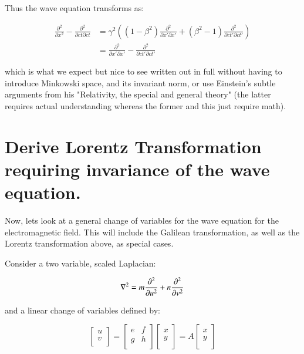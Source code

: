 Thus the wave equation transforms as:

\begin{align*}
\frac{\partial^2}{\partial x^2} - \frac{\partial^2}{\partial ct \partial ct}
&=
\gamma^2
\left(
(1 - \beta^2) \frac{\partial^2}{\partial x'\partial x'} + (\beta^2 -1)\frac{\partial^2}{\partial c t'\partial c t'}
\right) \\
&=
\frac{\partial^2}{\partial x'\partial x'} - \frac{\partial^2}{\partial c t'\partial c t'}
\end{align*}

which is what we expect but nice to see written out in full without having to introduce Minkowski space, and its invariant norm,
or use Einstein's subtle arguments from his "Relativity, the special and general theory" (the latter requires actual understanding
whereas the former and this just require math).

\section{Derive Lorentz Transformation requiring invariance of the wave equation. }

Now, lets look at a general change of variables for the wave equation for the electromagnetic field.  This will include
the Galilean transformation, as well as the Lorentz transformation above, as special cases.

Consider a two variable, scaled Laplacian:

\begin{equation}
\nabla^2 = m \frac{\partial^2}{\partial u^2} + n \frac{\partial^2}{\partial v^2}
\end{equation}

and a linear change of variables defined by:

\begin{equation}
\begin{bmatrix}
u \\
v \\
\end{bmatrix}
=
\begin{bmatrix}
e & f \\
g & h \\
\end{bmatrix}
\begin{bmatrix}
x \\
y \\
\end{bmatrix}
=
A
\begin{bmatrix}
x \\
y \\
\end{bmatrix}
\end{equation}

